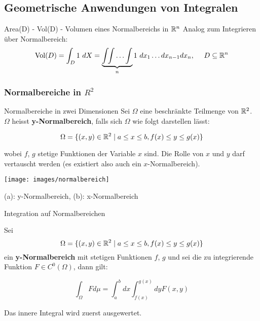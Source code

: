 
\subsection{Geometrische Anwendungen von Integralen}

\begin{Rezept}{Area(D) - Vol(D) - Volumen eines Normalbereichs in $\mathbb{R}^n$}{}
Analog zum Integrieren über Normalbereich:
\[ \text{Vol}(D) = \int_D 1 ~ dX = \underbrace{\int \!\! \int \ldots \int}_{n} 1 ~ dx_1 \ldots dx_{n-1} dx_n,  ~~~~ D \subseteq \mathbb{R}^n\]
\end{Rezept}

\subsubsection{Normalbereiche in \texorpdfstring{$R^2$}{R2}}

\begin{Definition}{Normalbereiche in zwei Dimensionen}{}
Sei $\Omega$ eine beschränkte Teilmenge von $\mathbb{R}^2$. $\Omega$ heisst \textbf{y-Normalbereich}, falls sich $\Omega$ wie folgt darstellen lässt:

\[
    \Omega = \{(x, y) \in \mathbb{R}^2 \mid a \leq x \leq b, f(x) \leq y \leq g(x)\}
\]

wobei $f$, $g$ stetige Funktionen der Variable $x$ sind. Die Rolle von $x$ und $y$ darf vertauscht werden (es existiert also auch ein $x$-Normalbereich).

\texttt{[image: images/normalbereich]}

(a): y-Normalbereich, (b): x-Normalbereich

\end{Definition}
\begin{Satz}{Integration auf Normalbereichen}{}

Sei \[\Omega = \{(x, y) \in \mathbb{R}^2 \mid a \leq x \leq b, f(x) \leq y \leq g(x)\}\] ein \textbf{y-Normalbereich} mit stetigen Funktionen $f$, $g$ und sei die zu integrierende Funktion $F \in C^0(\Omega)$, dann gilt:

\[
    \int_{\Omega} F d\mu = \int_a^b dx \int_{f(x)}^{g(x)} dy F(x, y)
\]

Das innere Integral wird zuerst ausgewertet.
\end{Satz}

